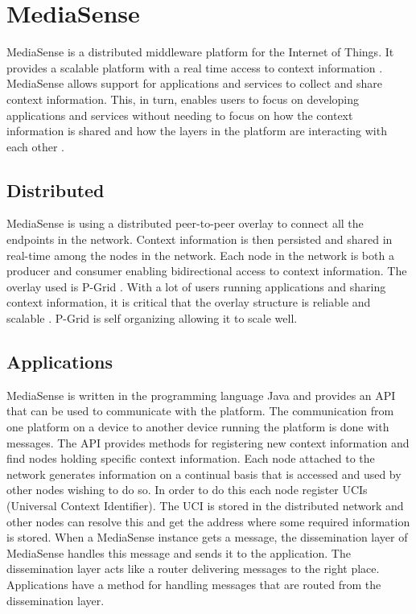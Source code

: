 \section{MediaSense}
MediaSense is a distributed middleware platform for the Internet of Things. It provides a scalable platform with a real time access to context information \cite{Kanter539187}. MediaSense allows support for applications and services to collect and share context information. This, in turn, enables users to focus on developing applications and services without needing to focus on how the context information is shared and how the layers in the platform are interacting with each other \cite{Walters413794}. 

\subsection{Distributed}
MediaSense is using a distributed peer-to-peer overlay to connect all the endpoints in the network. Context information is then persisted and shared in real-time among the nodes in the network. Each node in the network is both a producer and consumer enabling bidirectional access to context information. The overlay used is P-Grid \cite{aberer2003p}. With a lot of users running applications and sharing context information, it is critical that the overlay structure is reliable and scalable \cite{aberer2003p}. P-Grid is self organizing allowing it to scale well. 

\subsection{Applications}
MediaSense is written in the programming language Java and provides an API that can be used to communicate with the platform. The communication from one platform on a device to another device running the platform is done with messages. The API provides methods for registering new context information and find nodes holding specific context information. Each node attached to the network generates information on a continual basis that is accessed and used by other nodes wishing to do so. In order to do this each node register UCIs (Universal Context Identifier). The UCI is stored in the distributed network and other nodes can resolve this and get the address where some required information is stored. When a MediaSense instance gets a message, the dissemination layer of MediaSense handles this message and sends it to the application. The dissemination layer acts like a router delivering messages to the right place. Applications have a method for handling messages that are routed from the dissemination layer. 

